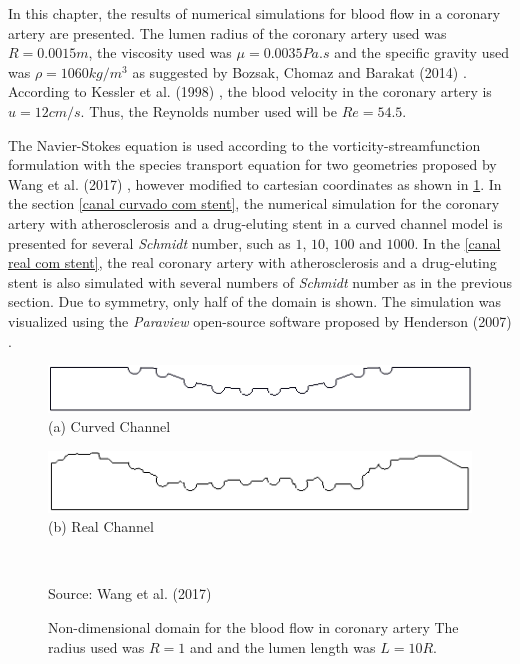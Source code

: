 In this chapter, the results of numerical simulations for 
blood flow in a coronary artery are presented. 
The lumen radius of the coronary artery used was $R=0.0015m$, 
the viscosity used was $\mu=0.0035Pa.s$ and the specific gravity used was
$\rho=1060kg/m^3$ as suggested by Bozsak, Chomaz and Barakat (2014)
 \cite{bozsak2014}. According to Kessler et al. (1998) 
\cite{kessler1998}, the blood velocity in the coronary artery 
is $u=12cm/s$. Thus, the Reynolds number used will be 
$Re=54.5$. 

\medskip
The Navier-Stokes equation is used according to the 
vorticity-streamfunction formulation with 
the species transport equation for two geometries proposed 
by Wang et al. (2017) \cite{wang2017}, however modified to 
cartesian coordinates as shown in \ref{coronary artery geo}. 
In the section \ref{canal curvado com stent}, the numerical 
simulation for the coronary artery with atherosclerosis 
and a drug-eluting stent in a curved channel model 
is presented for several 
\textit{Schmidt} number, such as $1$, $10$, $100$ and $1000$. 
In the \ref{canal real com stent}, the real coronary 
artery with atherosclerosis and a drug-eluting stent is also 
simulated with several numbers of \textit{Schmidt} number 
as in the previous section.
Due to symmetry, only half of the domain is shown. 
The simulation was visualized using the \textit{Paraview} open-source 
software proposed by Henderson (2007) \cite{paraview}.


\begin{figure}[H]
     \caption{Non-dimensional domain for the blood flow in coronary artery
     The radius used was $R=1$ and and the lumen length was $L=10R$.}
     \begin{center}
     \begin{minipage}{.45\linewidth}
     \begin{center}
      \includegraphics[scale=0.22]{./02_chaps/cap_solution/figure/CurvedStrut.png}\\
     (a) Curved Channel
     \end{center}
     \end{minipage}%
     \begin{minipage}{.45\linewidth}
     \begin{center}
      \includegraphics[scale=0.22]{./02_chaps/cap_solution/figure/RealStrut.png}\\
     (b) Real Channel
     \end{center}
     \end{minipage}\\[3mm]
     \end{center}
     \source Source: Wang et al. (2017) \cite{wang2017}
     \label{coronary artery geo}
\end{figure}
